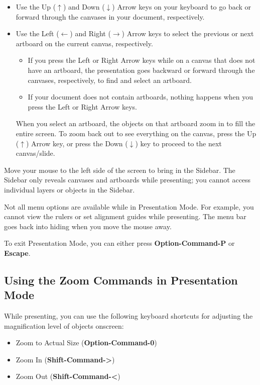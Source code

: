 \documentclass[../main.tex]{subfiles}
\begin{document}
\begin{itemize}
  \item Use the Up ($\uparrow$) and Down ($\downarrow$) Arrow keys on your keyboard to go back
    or forward through the canvases in your document, respectively.
  \item Use the Left ($\leftarrow$) and Right ($\rightarrow$) Arrow keys to select the previous
    or next artboard on the current canvas, respectively.

    \begin{itemize}
      \item If you press the Left or Right Arrow keys while on a canvas that does not have an
        artboard, the presentation goes backward or forward through the canvases, respectively, to
        find and select an artboard.
      \item If your document does not contain artboards, nothing happens when you press the Left
        or Right Arrow keys.
    \end{itemize}

    When you select an artboard, the objects on that artboard zoom in to fill the entire screen.
    To zoom back out to see everything on the canvas, press the Up ($\uparrow$) Arrow key, or
    press the Down ($\downarrow$) key to proceed to the next canvas/slide.
\end{itemize}

Move your mouse to the left side of the screen to bring in the Sidebar. The Sidebar only reveals
canvases and artboards while presenting; you cannot access individual layers or objects in the
Sidebar.

Not all menu options are available while in Presentation Mode. For example, you cannot view the
rulers or set alignment guides while presenting. The menu bar goes back into hiding when you
move the mouse away.

To exit Presentation Mode, you can either press \textbf{Option-Command-P} or \textbf{Escape}.

\subsection{Using the Zoom Commands in Presentation Mode}

While presenting, you can use the following keyboard shortcuts for adjusting the magnification
level of objects onscreen:

\begin{itemize}
  \item Zoom to Actual Size (\textbf{Option-Command-0})
  \item Zoom In (\textbf{Shift-Command->})
  \item Zoom Out (\textbf{Shift-Command-<})
\end{itemize}
\end{document}
